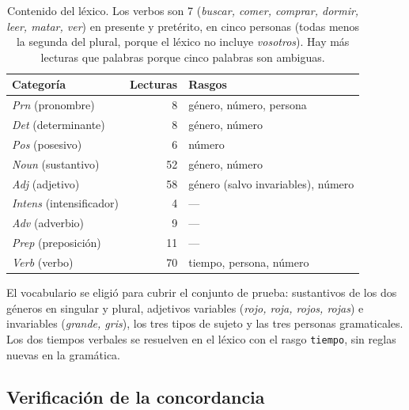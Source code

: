 \begin{table}[h]
  \centering
  \small
  \begin{tabular}{lrl}
    \toprule
    Categoría & Lecturas & Rasgos \\
    \midrule
    \textit{Prn} (pronombre) & 8 & género, número, persona \\
    \textit{Det} (determinante) & 8 & género, número \\
    \textit{Pos} (posesivo) & 6 & número \\
    \textit{Noun} (sustantivo) & 52 & género, número \\
    \textit{Adj} (adjetivo) & 58 & género (salvo invariables), número \\
    \textit{Intens} (intensificador) & 4 & --- \\
    \textit{Adv} (adverbio) & 9 & --- \\
    \textit{Prep} (preposición) & 11 & --- \\
    \textit{Verb} (verbo) & 70 & tiempo, persona, número \\
    \bottomrule
  \end{tabular}
  \caption{Contenido del léxico. Los verbos son 7 (\emph{buscar, comer, comprar, dormir, leer,
    matar, ver}) en presente y pretérito, en cinco personas (todas menos la segunda del plural,
    porque el léxico no incluye \emph{vosotros}). Hay más lecturas que palabras porque cinco
    palabras son ambiguas.}
  \label{tab:lexico}
\end{table}

El vocabulario se eligió para cubrir el conjunto de prueba: sustantivos de los dos géneros en
singular y plural, adjetivos variables (\emph{rojo, roja, rojos, rojas}) e invariables
(\emph{grande, gris}), los tres tipos de sujeto y las tres personas gramaticales. Los dos tiempos verbales se
resuelven en el léxico con el rasgo \texttt{tiempo}, sin reglas nuevas en la gramática.

\subsection{Verificación de la concordancia}


